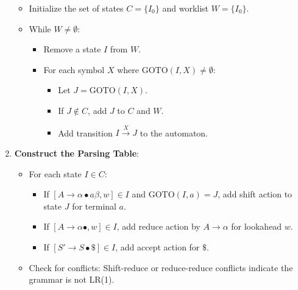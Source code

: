 \begin{enumerate}
\begin{itemize}
            \item Initialize the set of states \( C = \{I_0\} \) and worklist \( W = \{I_0\} \).
            \item While \( W \neq \emptyset \):
                \begin{itemize}
                    \item Remove a state \( I \) from \( W \).
                    \item For each symbol \( X \) where \( \text{GOTO}(I, X) \neq \emptyset \):
                        \begin{itemize}
                            \item Let \( J = \text{GOTO}(I, X) \).
                            \item If \( J \notin C \), add \( J \) to \( C \) and \( W \).
                            \item Add transition \( I \xrightarrow{X} J \) to the automaton.
                        \end{itemize}
                \end{itemize}
        \end{itemize}
    \item \textbf{Construct the Parsing Table}:
        \begin{itemize}
            \item For each state \( I \in C \):
                \begin{itemize}
                    \item If \( [A \to \alpha \bullet a \beta, w] \in I \) and \( \text{GOTO}(I, a) = J \), add shift action to state \( J \) for terminal \( a \).
                    \item If \( [A \to \alpha \bullet, w] \in I \), add reduce action by \( A \to \alpha \) for lookahead \( w \).
                    \item If \( [S' \to S \bullet \$] \in I \), add accept action for \( \$ \).
                \end{itemize}
            \item Check for conflicts: Shift-reduce or reduce-reduce conflicts indicate the grammar is not LR(1).
        \end{itemize}
\end{enumerate}
